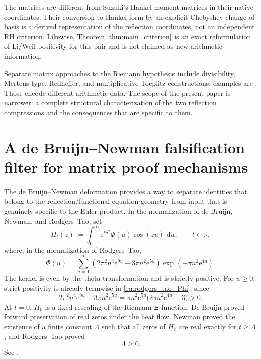 \documentclass[11pt]{amsart}
\numberwithin{equation}{section}
\theoremstyle{plain}
\theoremstyle{definition}
\theoremstyle{remark}
\newcommand{\e}{\mathrm e}
\newcommand{\dd}{\,\mathrm d}
\begin{document}
The matrices are different from Suzuki's Hankel moment matrices in their native coordinates.  Their conversion to Hankel form by an explicit Chebyshev change of basis is a derived representation of the reflection coordinates, not an independent RH criterion.  Likewise, Theorem \ref{thm:main_criterion} is an exact reformulation of Li/Weil positivity for this pair and is not claimed as new arithmetic information.

Separate matrix approaches to the Riemann hypothesis include divisibility, Mertens-type, Redheffer, and multiplicative Toeplitz constructions; examples are \cite{Roesler1986,Roesler1987,Vaughan1996,Hilberdink2006,Hilberdink2015}.  Those encode different arithmetic data.  The scope of the present paper is narrower: a complete structural characterization of the two reflection compressions and the consequences that are specific to them.

\section{A de Bruijn--Newman falsification filter for matrix proof mechanisms}
\label{sec:newman_filter}

The de Bruijn--Newman deformation provides a way to separate identities that belong to the
reflection/functional-equation geometry from input that is genuinely specific to the Euler product.
In the normalization of de Bruijn, Newman, and Rodgers--Tao, set
\begin{equation}
H_t(z):=\int_0^\infty \e^{tu^2}\Phi(u)\cos(zu)\,\dd u,
\qquad t\in\mathbb R,
\label{eq:newman_heat_flow}
\end{equation}
where, in the normalization of Rodgers--Tao,
\begin{equation}
\Phi(u)=\sum_{n=1}^{\infty}
\left(2\pi^2n^4\e^{9u}-3\pi n^2\e^{5u}\right)
\exp\!\left(-\pi n^2\e^{4u}\right).
\label{eq:rodgers_tao_Phi}
\end{equation}
The kernel is even by the theta transformation and is strictly positive.  For \(u\ge0\),
strict positivity is already termwise in \eqref{eq:rodgers_tao_Phi}, since
\[
2\pi^2n^4\e^{9u}-3\pi n^2\e^{5u}
=\pi n^2\e^{5u}\bigl(2\pi n^2\e^{4u}-3\bigr)>0.
\]
At \(t=0\), \(H_0\) is a fixed rescaling of the Riemann \(\Xi\)-function.  De Bruijn proved forward preservation of
real zeros under the heat flow, Newman proved the existence of a finite constant \(\Lambda\) such
that all zeros of \(H_t\) are real exactly for \(t\ge\Lambda\), and Rodgers--Tao proved
\begin{equation}
\boxed{\Lambda\ge0.}
\label{eq:newman_nonnegative}
\end{equation}
See \cite{deBruijn1950,Newman1976,RodgersTao2020}.
\end{document}
